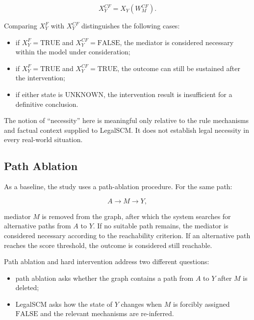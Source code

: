 \[
X_Y^{CF}
=
X_Y
\left(
    W^{CF}_{M}
\right).
\]

Comparing \(X_Y^{F}\) with \(X_Y^{CF}\) distinguishes the following cases:

\begin{itemize}
    \item if
    \(X_Y^{F}=\mathrm{TRUE}\) and
    \(X_Y^{CF}=\mathrm{FALSE}\),
    the mediator is considered necessary within the model under
    consideration;

    \item if
    \(X_Y^{F}=\mathrm{TRUE}\) and
    \(X_Y^{CF}=\mathrm{TRUE}\),
    the outcome can still be sustained after the intervention;

    \item if either state is
    \(\mathrm{UNKNOWN}\),
    the intervention result is insufficient for a definitive conclusion.
\end{itemize}

The notion of ``necessity'' here is meaningful only relative to the rule
mechanisms and factual context supplied to LegalSCM. It does not establish
legal necessity in every real-world situation.

\subsection{Path Ablation}

As a baseline, the study uses a path-ablation procedure. For the same path:

\[
A \rightarrow M \rightarrow Y,
\]

mediator \(M\) is removed from the graph, after which the system searches for
alternative paths from \(A\) to \(Y\). If no suitable path remains, the
mediator is considered necessary according to the reachability criterion. If
an alternative path reaches the score threshold, the outcome is considered
still reachable.

Path ablation and hard intervention address two different questions:

\begin{itemize}
    \item path ablation asks whether the graph contains a path from \(A\) to
    \(Y\) after \(M\) is deleted;

    \item LegalSCM asks how the state of \(Y\) changes when \(M\) is forcibly
    assigned \(\mathrm{FALSE}\) and the relevant mechanisms are re-inferred.
\end{itemize}

